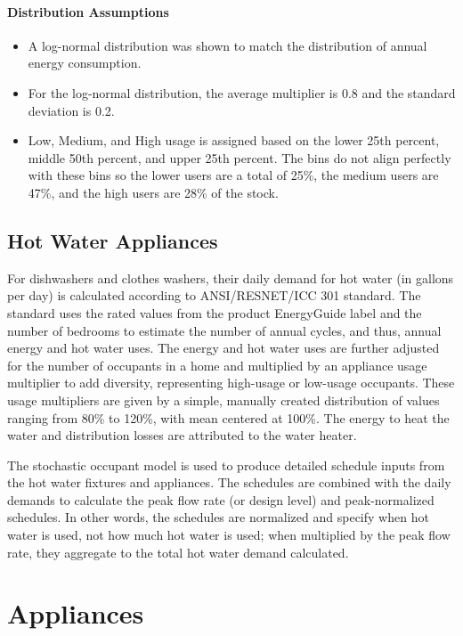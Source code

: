\paragraph{Distribution Assumptions}
\begin{itemize}
\item
  A log-normal distribution was shown to match the distribution of annual
  energy consumption.
\item
  For the log-normal distribution, the average multiplier is 0.8 and the
  standard deviation is 0.2.
\item
  Low, Medium, and High usage is assigned based on the lower 25th
  percent, middle 50th percent, and upper 25th percent. The bins do not
  align perfectly with these bins so the lower users are a total of 25\%, the medium users are 47\%, and the high users are 28\% of the stock.
\end{itemize}


\subsection{Hot Water Appliances}
For dishwashers and clothes washers, their daily demand for hot water (in gallons per day) is calculated according to ANSI/RESNET/ICC 301 standard. The standard uses the rated values from the product EnergyGuide label and the number of bedrooms to estimate the number of annual cycles, and thus, annual energy and hot water uses. The energy and hot water uses are further adjusted for the number of occupants in a home and multiplied by an appliance usage multiplier to add diversity, representing high-usage or low-usage occupants. These usage multipliers are given by a simple, manually created distribution of values ranging from 80\% to 120\%, with mean centered at 100\%. The energy to heat the water and distribution losses are attributed to the water heater.

The stochastic occupant model is used to produce detailed schedule inputs from the hot water fixtures and appliances. The schedules are combined with the daily demands to calculate the peak flow rate (or design level) and peak-normalized schedules. In other words, the schedules are normalized and specify when hot water is used, not how much hot water is used; when multiplied by the peak flow rate, they aggregate to the total hot water demand calculated.

\section{Appliances}

